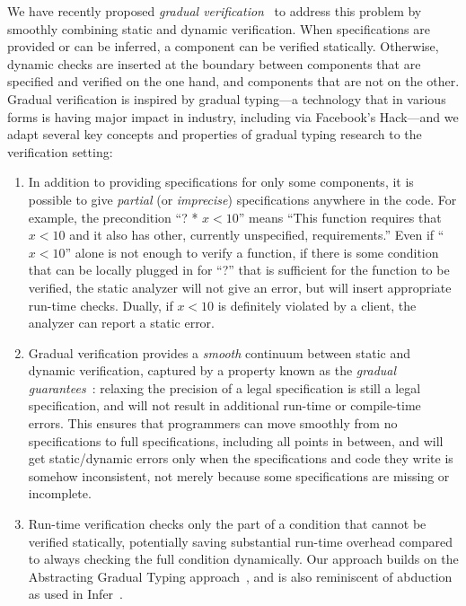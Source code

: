 \documentclass[10pt,twocolumn]{article}
\begin{document}
\begin{sloppypar}
We have recently proposed \textit{gradual verification}~\cite{baderAl:vmcai2018} to address this problem by smoothly combining static and dynamic verification. When specifications are provided or can be inferred, a component can be verified statically.  Otherwise, dynamic checks are inserted at the boundary between components that are specified and verified on the one hand, and components that are not on the other. Gradual verification is inspired by gradual typing---a technology that in various forms is having major impact in industry, including via Facebook's Hack---and we adapt several key concepts and properties of gradual typing research to the verification setting:

\begin{enumerate}[leftmargin=1em]\itemsep0em

\item
In addition to providing specifications for only some components, it is possible to give \textit{partial} (or {\em imprecise}) specifications anywhere in the code.  For example, the precondition ``? * $x<10$'' means ``This function requires that $x<10$ and it also has other, currently unspecified, requirements.''  Even if ``$x<10$'' alone is not enough to verify a function, if there is some condition that can be locally plugged in for ``?'' that is sufficient for the function to be verified, the static analyzer will not give an error, but will insert appropriate run-time checks. Dually, if $x<10$ is definitely violated by a client, the analyzer can report a static error.

\item
Gradual verification provides a {\em smooth} continuum between static and dynamic verification, captured by a property known as the \textit{gradual guarantees}~\cite{siekAl:snapl2015}: relaxing the precision of a legal specification is still a legal specification, and will not result in additional run-time or compile-time errors.  This ensures that programmers can move smoothly from no specifications to full specifications, including all points in between, and will get static/dynamic errors only when the specifications and code they write is somehow inconsistent, not merely because some specifications are missing or incomplete.

\item
Run-time verification checks only the part of a condition that cannot be verified statically, potentially saving substantial run-time overhead compared to always checking the full condition dynamically.  Our approach builds on the Abstracting Gradual Typing approach~\cite{garciaAl:popl2016}, and is also reminiscent of abduction as used in Infer~\cite{Calcagno:2011:CSA:2049697.2049700}.


\end{enumerate}
\end{sloppypar}
\end{document}
